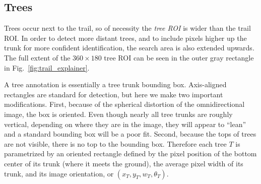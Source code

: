 \documentclass[letterpaper, 10 pt, conference]{ieeeconf}  %
\newcommand{\comment}[1]{\textcolor{red}{#1}}
\begin{document}





\subsection{Trees}

Trees occur next to the trail, so of necessity the \textit{tree ROI} is
wider than the trail ROI.  In order to detect more distant trees, and
to include pixels higher up the trunk for more confident
identification, the search area is also extended upwards.  The full
extent of the $360 \times 180$ tree ROI can be seen in the outer gray rectangle in Fig.~\ref{fig:trail_explainer}.



A tree annotation is essentially a tree trunk bounding box.
Axis-aligned rectangles are standard for detection, but here we make
two important modifications.  First, because of the spherical
distortion of the omnidirectional image, the box is oriented.  Even
though nearly all tree trunks are roughly vertical, depending on where
they are in the image, they will appear to ``lean'' and a standard
bounding box will be a poor fit.  Second, because the tops of trees
are not visible, there is no top to the bounding box.  Therefore each
tree $T$ is parametrized by an oriented rectangle defined by the pixel
position of the bottom center of its trunk (where it meets the
ground), the average pixel width of its trunk, and its image
orientation, or $(x_{T}, y_{T}, w_{T}, \theta_{T})$.
\end{document}
